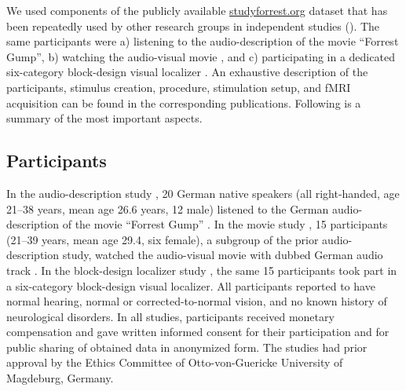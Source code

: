
We used components of the publicly available
\href{http://www.studyforrest.org}{studyforrest.org} dataset that has
been repeatedly used by other research groups in independent studies
(\citep[e.g.,][]{ben2018hippocampal, jiahui2019predicting, hu2017decoding,
lettieri2019emotionotopy, nguyen2016integration}).
The same participants were
a) listening to the audio-description \citep{hanke2014audiomovie} of
the movie ``Forrest Gump'',
b) watching the audio-visual movie \citep{hanke2016simultaneous}, and
c) participating in a dedicated six-category block-design visual localizer
\citep{sengupta2016extension}.
An exhaustive description of the participants, stimulus creation, procedure,
stimulation setup, and fMRI acquisition can be found in the corresponding
publications. Following is a summary of the most important aspects.


\subsection{Participants}




In the audio-description study \citep{hanke2014audiomovie}, 20 German native
speakers (all right-handed, age 21–38 years, mean age 26.6 years, 12 male)
listened to the German audio-description \citep{ForrestGumpGermanAD} of the
movie ``Forrest Gump'' \citep{ForrestGumpMovie}.
In the movie study \citep{hanke2016simultaneous}, 15 participants (21–39 years,
mean age 29.4, six female), a subgroup of the prior audio-description study,
watched the audio-visual movie with dubbed German audio track
\citep{ForrestGumpDVD}.
In the block-design localizer study \citep{sengupta2016extension}, the same 15
participants took part in a six-category block-design visual localizer.
All participants reported to have normal hearing, normal or corrected-to-normal
vision, and no known history of neurological disorders.
In all studies, participants received monetary compensation and gave written
informed consent for their participation and for public sharing of obtained data
in anonymized form. The studies had prior approval by the Ethics Committee of
Otto-von-Guericke University of Magdeburg, Germany.


